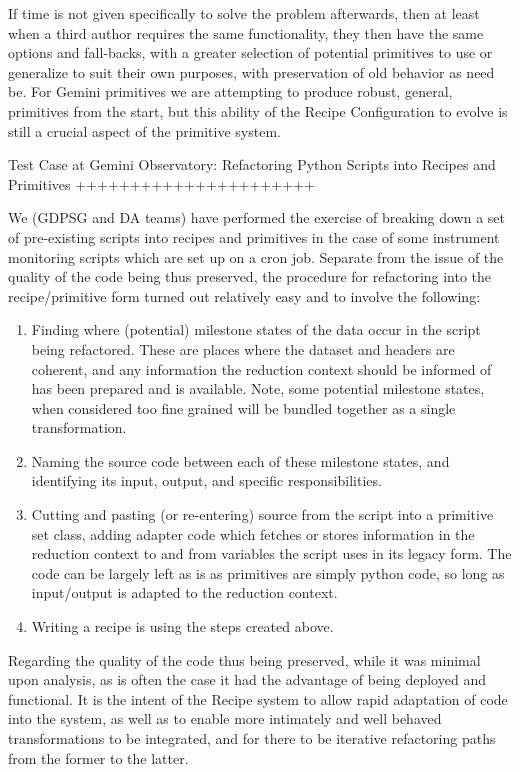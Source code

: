 \documentclass[letterpaper,10pt,english]{sphinxmanual}
\begin{document}
If time is not given specifically to solve the problem afterwards,
then at least when a third author requires the same functionality,
they then have the same options and fall-backs, with a greater
selection of potential primitives to use or generalize to suit their
own purposes, with preservation of old behavior as need be. For Gemini
primitives we are attempting to produce robust, general, primitives
from the start, but this ability of the Recipe Configuration to evolve
is still a crucial aspect of the primitive system.

Test Case at Gemini Observatory: Refactoring Python Scripts into
Recipes and Primitives
++++++++++++++++++++++

We (GDPSG and DA teams) have performed the exercise of breaking down a
set of pre-existing scripts into recipes and primitives in the case of
some instrument monitoring scripts which are set up on a cron job.
Separate from the issue of the quality of the code being thus
preserved, the procedure for refactoring into the recipe/primitive
form turned out relatively easy and to involve the following:
\begin{enumerate}
\item {} 
Finding where (potential) milestone states of the data occur in the
script being refactored. These are places where the dataset and
headers are coherent, and any information the reduction context should
be informed of has been prepared and is available. Note, some
potential milestone states, when considered too fine grained will be
bundled together as a single transformation.

\item {} 
Naming the source code between each of these milestone states, and
identifying its input, output, and specific responsibilities.

\item {} 
Cutting and pasting (or re-entering) source from the script into a
primitive set class, adding adapter code which fetches or stores
information in the reduction context to and from variables the script
uses in its legacy form. The code can be largely left as is as
primitives are simply python code, so long as input/output is adapted
to the reduction context.

\item {} 
Writing a recipe is using the steps created above.

\end{enumerate}

Regarding the quality of the code thus being preserved, while it was
minimal upon analysis, as is often the case it had the advantage of
being deployed and functional. It is the intent of the Recipe system
to allow rapid adaptation of code into the system, as well as to
enable more intimately and well behaved transformations to be
integrated, and for there to be iterative refactoring paths from the
former to the latter.
\end{document}
